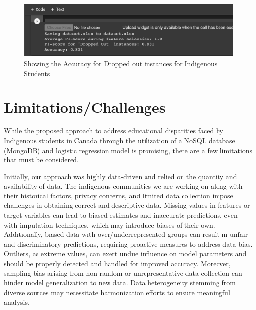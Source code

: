 \documentclass[final,12p,twocolumn]{article}
\begin{document}
\begin{figure}[!htb]
	\centering 
	\includegraphics[width=1.0\linewidth,keepaspectratio]{images/Result.png}	
	\caption{Showing the Accuracy for Dropped out instances for Indigenous Students} 
	\label{fig:result}
\end{figure}

\vspace{-0.5cm}
\section{Limitations/Challenges}
While the proposed approach to address educational disparities faced by Indigenous students in Canada through the utilization of a NoSQL database (MongoDB) and logistic regression model is promising, there are a few limitations that must be considered.

Initially, our approach was highly data-driven and relied on the quantity and availability of data. The indigenous communities we are working on along with their historical factors, privacy concerns, and limited data collection impose challenges in obtaining correct and descriptive data. Missing values in features or target variables can lead to biased estimates and inaccurate predictions, even with imputation techniques, which may introduce biases of their own. Additionally, biased data with over/underrepresented groups can result in unfair and discriminatory predictions, requiring proactive measures to address data bias. Outliers, as extreme values, can exert undue influence on model parameters and should be properly detected and handled for improved accuracy. Moreover, sampling bias arising from non-random or unrepresentative data collection can hinder model generalization to new data. Data heterogeneity stemming from diverse sources may necessitate harmonization efforts to ensure meaningful analysis.
\end{document}
